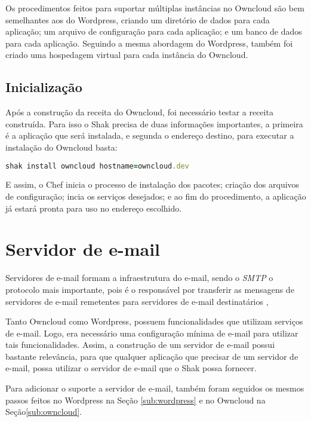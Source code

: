 Os procedimentos feitos para suportar múltiplas instâncias
no Owncloud são bem semelhantes aos do Wordpress, criando um diretório de dados
para cada aplicação; um arquivo de configuração para cada aplicação; e um banco de
dados para cada aplicação. Seguindo a mesma abordagem do Wordpress, também
foi criado uma hospedagem virtual para cada instância do Owncloud.

\subsection{Inicialização}

Após a construção da receita do Owncloud, foi necessário testar a receita construída. 
Para isso o Shak precisa de duas informações importantes, a primeira é a aplicação
que será instalada, e segunda o endereço destino, para executar a instalação
do Owncloud basta:

\begin{lstlisting}[language=Ruby,label=dice_index,caption={Exemplo de execução de instalação do Owncloud com shak}]
shak install owncloud hostname=owncloud.dev
\end{lstlisting}

E assim, o Chef inicia o processo de instalação dos pacotes; criação dos arquivos
de configuração; incia os serviços desejados; e ao fim do procedimento, a aplicação
já estará pronta para uso no endereço escolhido.

\section{Servidor de e-mail}
\label{sub:e-mail}

Servidores de e-mail formam a infraestrutura do e-mail, sendo o \textit{SMTP} o protocolo
mais importante, pois é o responsável por transferir as mensagens de servidores
de e-mail remetentes para servidores de e-mail destinatários \cite{kurose2010redes}, 

Tanto Owncloud como Wordpress, possuem funcionalidades que utilizam serviços 
de e-mail. Logo, era necessário uma configuração mínima de e-mail para utilizar 
tais funcionalidades. Assim, a construção de um servidor de e-mail 
possui bastante relevância, para que qualquer aplicação que precisar de um 
servidor de e-mail, possa utilizar o servidor de e-mail que o Shak possa fornecer.

Para adicionar o suporte a servidor de e-mail, também foram seguidos os mesmos passos
feitos no Wordpress na Seção \ref{sub:wordpress} e no Owncloud na Seção\ref{sub:owncloud}. 

